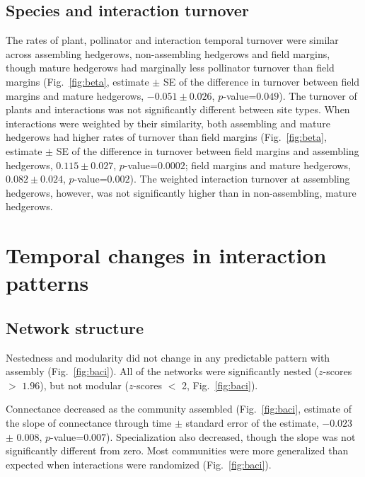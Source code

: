 \documentclass[12pt]{article}
\begin{document}
\subsection*{Species and interaction turnover}
The rates of plant, pollinator and interaction temporal turnover were
similar across assembling hedgerows, non-assembling hedgerows and
field margins, though mature hedgerows had marginally less pollinator
turnover than field margins (Fig.~\ref{fig:beta}, estimate $\pm$ SE of
the difference in turnover between field margins and mature hedgerows,
$-0.051 \pm 0.026$, $p$-value=$0.049$). The turnover of plants and
interactions was not significantly different between site types. When
interactions were weighted by their similarity, both assembling and
mature hedgerows had higher rates of turnover than field margins
(Fig.~\ref{fig:beta}, estimate $\pm$ SE of the difference in turnover
between field margins and assembling hedgerows, $0.115 \pm 0.027$,
$p$-value=$0.0002$; field margins and mature hedgerows, $0.082 \pm
0.024$, $p$-value=$0.002$). The weighted interaction turnover at
assembling hedgerows, however, was not significantly higher than in
non-assembling, mature hedgerows.

\section*{Temporal changes in interaction patterns}
\subsection*{Network structure}
Nestedness and modularity did not change in any predictable pattern
with assembly (Fig.~\ref{fig:baci}). All of the networks were
significantly nested ($z$-scores $>$ $1.96$), but not modular ($z$-scores
$<$ 2, Fig.~\ref{fig:baci}).


Connectance decreased as the community assembled (Fig.~\ref{fig:baci},
estimate of the slope of connectance through time $\pm$ standard error
of the estimate, $-0.023$ $\pm$ $0.008$,
$p$-value=$0.007$). Specialization also decreased, though the slope
was not significantly different from
zero. %
Most communities were more generalized than expected when interactions
were randomized (Fig.~\ref{fig:baci}).
\end{document}
